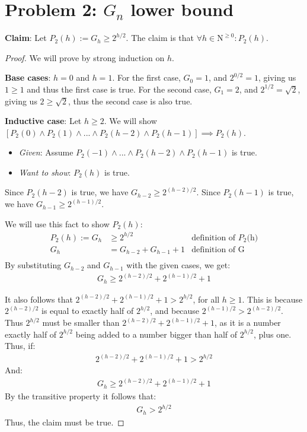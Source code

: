 \documentclass[titlepage]{article}
\begin{document}
\section{Problem 2: $G_n$ lower bound}

\textbf{Claim}: Let $P_2(h) := G_h \geq 2^{h/2}$.  The claim is that $\forall h \in \mathrm{N}^{\geq 0}: P_2(h)$.

\begin{proof}
We will prove by strong induction on $h$.

\textbf{Base cases}: $h=0$ and $h=1$.  For the first case, $G_{0} = 1$, and $2^{0/2} = 1$, giving us $1 \geq 1$ and thus the first case is true. For the second case, $G_1 = 2$, and $2^{1/2} = \sqrt{2}$, giving us $2 \geq \sqrt{2}$, thus the second case is also true. 


\textbf{Inductive case}: Let $h \geq 2$.  We will show $[P_2(0) \land P_2(1) \land ... \land P_2(h-2) \land P_2(h-1)] \implies P_2(h)$.
\begin{itemize}
\item \emph{Given}: Assume $P_2(-1) \land ... \land P_2(h-2) \land P_2(h-1)$ is true.
\item \emph{Want to show}: $P_2(h)$ is true.
\end{itemize}
Since $P_2(h-2)$ is true, we have
$G_{h-2} \geq 2^{(h-2)/2}$.
Since $P_2(h-1)$ is true, we have
$G_{h-1} \geq 2^{(h-1)/2}$.

We will use this fact to show $P_2(h)$:
\begin{align*}
P_2(h) := G_{h} &\geq 2^{h/2} & \text{definition of $P_2$(h)} \\
G_{h} &= G_{h-2} + G_{h-1} + 1 & \text{definition of G} \\
\end{align*}
By substituting $G_{h-2}$ and $G_{h-1}$ with the given cases, we get:\\
\begin{align*}
G_h \geq 2^{(h-2)/2} + 2^{(h-1)/2} + 1
\end{align*}

It also follows that $2^{(h-2)/2} + 2^{(h-1)/2} + 1 > 2^{h/2}$, for all $h \geq 1$. This is because $2^{(h-2)/2}$ is equal to exactly half of $2^{h/2}$, and because $2^{(h-1)/2} > 2^{(h-2)/2}$. Thus $2^{h/2}$ must be smaller than $2^{(h-2)/2} + 2^{(h-1)/2} + 1$, as it is a number exactly half of  $2^{h/2}$ being added to a number bigger than half of $2^{h/2}$, plus one. Thus, if:
\begin{align*}
2^{(h-2)/2} + 2^{(h-1)/2} + 1 > 2^{h/2}
\end{align*}
And:
\begin{align*}
G_h \geq 2^{(h-2)/2} + 2^{(h-1)/2} + 1
\end{align*}
By the transitive property it follows that:
\begin{align*}
G_{h} > 2^{h/2}
\end{align*}
Thus, the claim must be true.
\end{proof}
\end{document}
